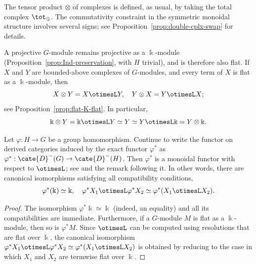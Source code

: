 The tensor product $\otimes$ of complexes is defined, as usual, by taking the
total complex $\tot_{\oplus}$. The commutativity constraint in the symmetric
monoidal structure involves several signs; see
Proposition~\ref{prop:double-cplx-swap} for details.

A projective $G$-module remains projective as a $\Bbbk$-module
(Proposition~\ref{prop:Ind-preservation}, with $H$ trivial), and is therefore
also flat. If $X$ and $Y$ are bounded-above complexes of $G$-modules, and
every term of $X$ is flat as a $\Bbbk$-module, then
\[ X \otimes Y = X \otimesL Y, \quad Y \otimes X = Y \otimesL X; \]
see Proposition~\ref{prop:flat-K-flat}. In particular,
\begin{equation}\label{eqn:G-mod-tensor-unit}
	\Bbbk \otimes Y = \Bbbk \otimesL Y \simeq Y \simeq Y \otimesL \Bbbk = Y \otimes \Bbbk.
\end{equation}

\begin{lemma}\label{prop:group-pullback-monoidal}
	Let $\varphi:H\to G$ be a group homomorphism. Continue to write the functor
	on derived categories induced by the exact functor $\varphi^*$ as
	$\varphi^*:\cate{D}^-(G)\to\cate{D}^-(H)$. Then $\varphi^*$ is a
	monoidal functor with respect to $\otimesL$; see
	\cite[Definition 3.1.7]{Li1} and the remark following it. In other words,
	there are canonical isomorphisms satisfying all compatibility conditions,
	\[ \varphi^*(\Bbbk) \simeq \Bbbk, \quad \varphi^* X_1 \otimesL \varphi^* X_2 \simeq \varphi^* (X_1 \otimesL X_2). \]
\end{lemma}

\begin{proof}
	The isomorphism $\varphi^*\Bbbk\simeq\Bbbk$ (indeed, an equality) and all
	its compatibilities are immediate. Furthermore, if a $G$-module $M$ is
	flat as a $\Bbbk$-module, then so is $\varphi^*M$. Since $\otimesL$ can be
	computed using resolutions that are flat over $\Bbbk$, the canonical
	isomorphism
	$\varphi^*X_1\otimesL\varphi^*X_2\simeq\varphi^*(X_1\otimesL X_2)$
	is obtained by reducing to the case in which $X_1$ and $X_2$ are termwise
	flat over $\Bbbk$.
\end{proof}

